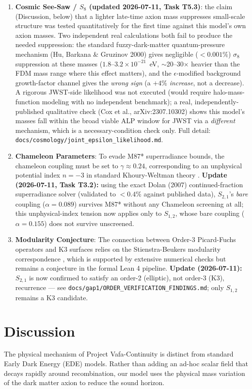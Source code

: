 \documentclass[12pt]{article}
\begin{document}
\begin{enumerate}
    \item \textbf{Cosmic See-Saw / $S_8$ (updated 2026-07-11, Task T5.3)}: the claim (Discussion, below) that a lighter late-time axion mass suppresses small-scale structure was tested quantitatively for the first time against this model's own axion masses. Two independent real calculations both fail to produce the needed suppression: the standard fuzzy-dark-matter quantum-pressure mechanism (Hu, Barkana \& Gruzinov 2000) gives negligible ($<0.001\%$) $\sigma_8$ suppression at these masses ($1.8$--$3.2\times10^{-21}$~eV, $\sim$20--30$\times$ heavier than the FDM mass range where this effect matters), and the $\epsilon$-modified background growth-factor channel gives the \emph{wrong sign} (a $+4\%$ \emph{increase}, not a decrease). A rigorous JWST-side likelihood was not executed (would require halo-mass-function modeling with no independent benchmark); a real, independently-published qualitative check (Cox et al., arXiv:2307.10302) shows this model's masses fall within the broad viable ALP window for JWST via a \emph{different} mechanism, which is a necessary-condition check only. Full detail: \texttt{docs/cosmology/joint\_epsilon\_likelihood.md}.
    \item \textbf{Chameleon Parameters}: To evade M87* superradiance bounds, the chameleon coupling must be set to $\gamma \approx 0.24$, corresponding to an unphysical potential index $n = -3$ in standard Khoury-Weltman theory \cite{khoury2004chameleon}. \textbf{Update (2026-07-11, Task T3.2):} using the exact Dolan (2007) continued-fraction superradiance solver (validated to $<0.4\%$ against published data), $S_{2,1}$'s \emph{bare} coupling ($\alpha=0.089$) survives M87* without any Chameleon screening at all; this unphysical-index tension now applies only to $S_{1,2}$, whose bare coupling ($\alpha=0.155$) does not survive unscreened.
    \item \textbf{Modularity Conjecture}: The connection between Order-3 Picard-Fuchs operators and K3 surfaces relies on the Stienstra-Beukers modularity correspondence \cite{stienstra1992}, which is supported by extensive numerical checks but remains a conjecture in the formal Lean 4 pipeline. \textbf{Update (2026-07-11):} $S_{2,1}$ is now confirmed to satisfy an order-2 (elliptic), not order-3 (K3), recurrence — see \texttt{docs/gap1/ORDER\_VERIFICATION\_FINDINGS.md}; only $S_{1,2}$ remains a K3 candidate.
\end{enumerate}

\section{Discussion}
The physical mechanism of Project Vafa-Continuity is distinct from standard Early Dark Energy (EDE) models. Rather than adding an ad-hoc scalar field that decays rapidly around recombination, our model uses the physical mass variation of the dark matter axion to reduce the sound horizon. 
\end{document}
